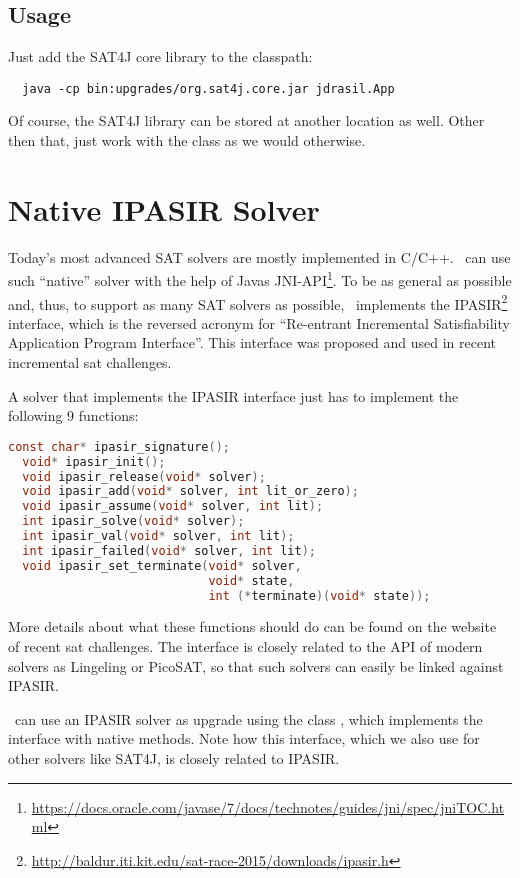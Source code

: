 \documentclass[a4paper, ukenglish, twoside, openright]{jdrasilmanual}
\begin{document}
\subsection{Usage}
Just add the SAT4J core library to the classpath:
\begin{lstlisting}
  java -cp bin:upgrades/org.sat4j.core.jar jdrasil.App
\end{lstlisting}
Of course, the SAT4J library can be stored at another location as
well. Other then that, just work with the class 
as we would otherwise.

\section{Native IPASIR Solver}

Today's most advanced SAT solvers are mostly implemented in
C/C++. \Jdrasil\ can use such ``native'' solver with the help of Javas
JNI-API\footnote{\url{https://docs.oracle.com/javase/7/docs/technotes/guides/jni/spec/jniTOC.html}}. 
To be as general as possible and, thus, to support as many SAT solvers
as possible, \Jdrasil\ implements the
IPASIR\footnote{\url{http://baldur.iti.kit.edu/sat-race-2015/downloads/ipasir.h}}
interface, which is the reversed acronym for ``Re-entrant Incremental
Satisfiability Application Program Interface''. This interface was
proposed and used in recent incremental sat challenges. 

A solver that implements the IPASIR interface just has to implement
the following 9 functions:
\begin{lstlisting}[language=c]
  const char* ipasir_signature();
  void* ipasir_init();
  void ipasir_release(void* solver);
  void ipasir_add(void* solver, int lit_or_zero);
  void ipasir_assume(void* solver, int lit);
  int ipasir_solve(void* solver);
  int ipasir_val(void* solver, int lit);
  int ipasir_failed(void* solver, int lit);
  void ipasir_set_terminate(void* solver, 
                            void* state, 
                            int (*terminate)(void* state));
\end{lstlisting}
More details about what these functions should do can be found on the
website of recent sat challenges. The interface is closely related to
the API of modern solvers as Lingeling or PicoSAT, so that such
solvers can easily be linked against IPASIR.

\Jdrasil\ can use an IPASIR solver as upgrade using the class
, which implements the interface
 with native methods. Note how this
interface, which we also use for other solvers like SAT4J, is closely
related to IPASIR. 
\end{document}
